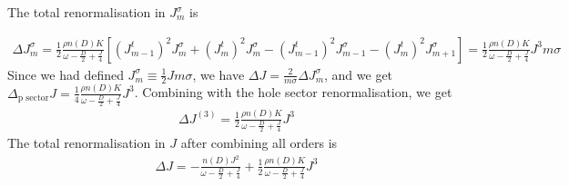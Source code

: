 \documentclass[reprint,prb,superscriptaddress]{revtex4-2}
\begin{document}
The total renormalisation in  \(J^\sigma_m\) is
\begin{widetext}
\begin{equation}\begin{aligned}
	\Delta J^\sigma_m = \frac{1}{2}\frac{\rho n(D) K}{\omega - \frac{D}{2} + \frac{J}{4}}\left[\left( J^t_{m-1} \right)^2 J^\sigma_m + \left( J^t_m \right)^2 J^\sigma_m - \left( J^t_{m-1} \right)^2 J^\sigma_{m-1} - \left(J^t_m\right)^2 J^\sigma_{m+1} \right] = \frac{1}{2}\frac{\rho n(D) K}{\omega - \frac{D}{2} + \frac{J}{4}}J^3 m \sigma
\end{aligned}\end{equation}
Since we had defined \(J^\sigma_m \equiv \frac{1}{2}J m \sigma\), we have \(\Delta J = \frac{2}{m\sigma}\Delta J^\sigma_m\), and we get \(\Delta_\text{p sector} J = \frac{1}{4}\frac{\rho n(D) K}{\omega - \frac{D}{2} + \frac{J}{4}}J^3\).
Combining with the hole sector renormalisation, we get
\begin{equation}\begin{aligned}
	\Delta J^{(3)} = \frac{1}{2}\frac{\rho n(D) K}{\omega - \frac{D}{2} + \frac{J}{4}}J^3
\end{aligned}\end{equation}
The total renormalisation in \(J\) after combining all orders is
\begin{equation}\begin{aligned}
	\Delta J = -\frac{n(D) J^2}{\omega - \frac{D}{2} + \frac{J}{4}} + \frac{1}{2}\frac{\rho n(D) K}{\omega - \frac{D}{2} + \frac{J}{4}}J^3
\end{aligned}\end{equation}
\end{widetext}
\end{document}
